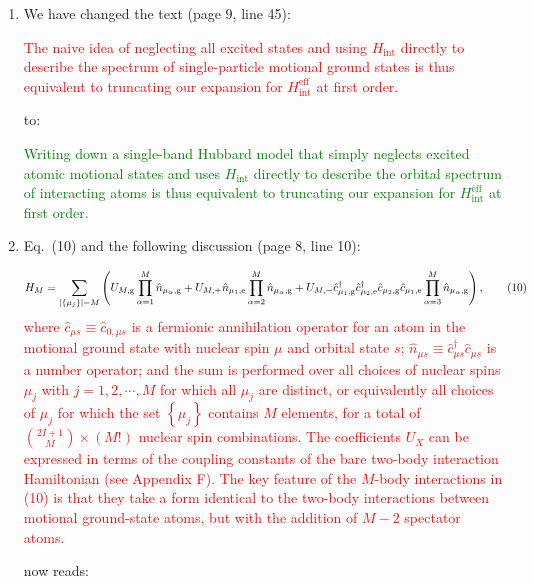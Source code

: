 \documentclass[preprint]{revtex4-1}
\renewcommand{\t}{\text} %
\newcommand{\p}[1]{\left(#1\right)} %
\renewcommand{\set}[1]{\left\{#1\right\}} %
\newcommand{\g}{\text{g}}
\newcommand{\e}{\text{e}}
\renewcommand{\c}{\hat{c}}
\newcommand{\n}{\hat{n}}
\newcommand{\1}{\mathds{1}}
\newcommand{\red}[1]{\textcolor{red}{#1}}
\newcommand{\green}[1]{\textcolor{green}{#1}}
\newcounter{point}
\newcommand{\step}{\stepcounter{point}\setcounter{enumi}{0}}
\begin{document}
\begin{enumerate}[label=(R1.\arabic{point}.\arabic*)]
\item We have changed the text (page 9, line 45):

  \red{The naive idea of neglecting all excited states and using
    $H_{\t{int}}$ directly to describe the spectrum of single-particle
    motional ground states is thus equivalent to truncating our
    expansion for $H_{\t{int}}^{\t{eff}}$ at first order.}

  to:

  \green{Writing down a single-band Hubbard model that simply neglects
    excited atomic motional states and uses $H_{\t{int}}$ directly to
    describe the orbital spectrum of interacting atoms is thus
    equivalent to truncating our expansion for $H_{\t{int}}^{\t{eff}}$
    at first order.}


  \step
\item Eq.~(10) and the following discussion (page 8, line 10):

  \red{\begin{align*} H_M = \sum_{\abs{\set{\mu_j}}=M} \p{U_{M,\g}
        \prod_{\alpha=1}^M \n_{\mu_\alpha,\g} + U_{M,+} \n_{\mu_1,\e}
        \prod_{\alpha=2}^M \n_{\mu_\alpha,\g} + U_{M,-}
        \c_{\mu_1,\g}^\dag \c_{\mu_2,\e}^\dag \c_{\mu_2,\g}
        \c_{\mu_1,\e} \prod_{\alpha=3}^M \n_{\mu_\alpha,\g}},
      \tag{10}
    \end{align*}
    where $\c_{\mu s}\equiv\c_{0,\mu s}$ is a fermionic annihilation
    operator for an atom in the motional ground state with nuclear
    spin $\mu$ and orbital state $s$;
    $\n_{\mu s}\equiv \c_{\mu s}^\dag \c_{\mu s}$ is a number
    operator; and the sum is performed over all choices of nuclear
    spins $\mu_j$ with $j=1,2,\cdots,M$ for which all $\mu_j$ are
    distinct, or equivalently all choices of $\mu_j$ for which the set
    $\set{\mu_j}$ contains $M$ elements, for a total of
    ${2I+1\choose M}\times\p{M!}$ nuclear spin combinations.  The
    coefficients $U_X$ can be expressed in terms of the coupling
    constants of the bare two-body interaction Hamiltonian (see
    Appendix F).  The key feature of the $M$-body interactions in (10)
    is that they take a form identical to the two-body interactions
    between motional ground-state atoms, but with the addition of
    $M-2$ spectator atoms.}

  now reads:


\end{enumerate}
\end{document}
